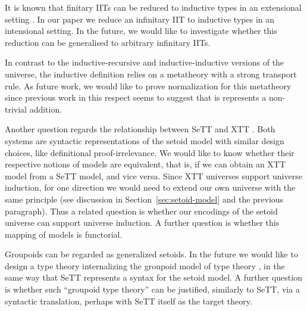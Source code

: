 \documentclass[autoref]{llncs}
\begin{document}
It is known that finitary IITs can be reduced to inductive types in an
extensional setting \cite{induction-is-enough}. In our paper we reduce
an infinitary IIT to inductive types in an intensional setting. In the
future, we would like to investigate whether this reduction can be
generalised to arbitrary infinitary IITs.

In contrast to the inductive-recursive and inductive-inductive
versions of the universe, the inductive definition relies on a
metatheory with a strong transport rule. As future work, we would like
to prove normalization for this metatheory since previous work in
this respect \cite{abel2019failure} seems to suggest that is
represents a non-trivial addition.

Another question regards the relationship between SeTT \cite{mpc19} and XTT
\cite{xtt}. Both systems are syntactic representations of the setoid model with
similar design choices, like definitional proof-irrelevance. We would like to
know whether their respective notions of models are equivalent, that is, if we
can obtain an XTT model from a SeTT model, and vice versa. Since XTT universes
support universe induction, for one direction we would need to extend our own
universe with the same principle (see discussion in
Section~\ref{sec:setoid-model} and the previous paragraph). Thus a related
question is whether our encodings of the setoid universe can support universe
induction. A further question is whether this mapping of models is functorial.

Groupoids can be regarded as generalized setoids. In the future we would like to
design a type theory internalizing the groupoid model of type theory
\cite{groupoid}, in the same way that SeTT represents a syntax for the setoid
model. A further question is whether such ``groupoid type theory'' can be
justified, similarly to SeTT, via a syntactic translation, perhaps with SeTT
itself as the target theory.


\end{document}

